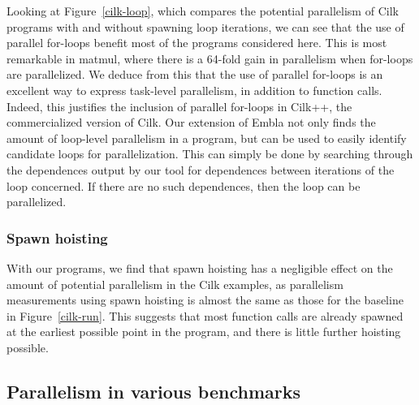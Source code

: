 Looking at Figure~\ref{cilk-loop}, which compares the potential parallelism of Cilk programs with and without spawning loop iterations, we can see that the use of parallel for-loops benefit most of the programs considered here.
This is most remarkable in \textsf{matmul}, where there is a 64-fold gain in parallelism when for-loops are parallelized.
We deduce from this that the use of parallel for-loops is an excellent way to express task-level parallelism, in addition to function calls.
Indeed, this justifies the inclusion of parallel for-loops in Cilk++, the commercialized version of Cilk.
Our extension of Embla not only finds the amount of loop-level parallelism in a program, but can be used to easily identify candidate loops for parallelization.
This can simply be done by searching through the dependences output by our tool for dependences between iterations of the loop concerned.
If there are no such dependences, then the loop can be parallelized.

\subsubsection{Spawn hoisting}


With our programs, we find that spawn hoisting has a negligible effect on the amount of potential parallelism in the Cilk examples, as parallelism measurements using spawn hoisting is almost the same as those for the baseline in Figure~\ref{cilk-run}.
This suggests that most function calls are already spawned at the earliest possible point in the program, and there is little further hoisting possible.

\subsection{Parallelism in various benchmarks}

